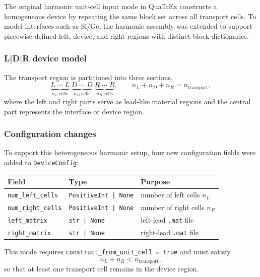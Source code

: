 The original harmonic unit-cell input mode in QuaTrEx constructs a
homogeneous device by repeating the same block set across all transport
cells.  To model interfaces such as Si/Ge, the harmonic assembly was
extended to support piecewise-defined left, device, and right regions
with distinct block dictionaries.

\subsubsection{L|D|R device model}

The transport region is partitioned into three sections,
\begin{equation}\label{eq:ldr}
  \underbrace{L\;\cdots\;L}_{n_L\;\text{cells}}
  \;\underbrace{D\;\cdots\;D}_{n_D\;\text{cells}}
  \;\underbrace{R\;\cdots\;R}_{n_R\;\text{cells}},
  \qquad
  n_L + n_D + n_R = n_\mathrm{transport},
\end{equation}
where the left and right parts serve as lead-like material regions and
the central part represents the interface or device region.

\subsubsection{Configuration changes}

To support this heterogeneous harmonic setup, four new configuration
fields were added to \texttt{DeviceConfig}:
\begin{center}
\begin{tabular}{lll}
  \toprule
  Field & Type & Purpose \\
  \midrule
  \texttt{num\_left\_cells}  & \texttt{PositiveInt | None} & number of left cells $n_L$ \\
  \texttt{num\_right\_cells} & \texttt{PositiveInt | None} & number of right cells $n_R$ \\
  \texttt{left\_matrix}      & \texttt{str | None}         & left-lead \texttt{.mat} file \\
  \texttt{right\_matrix}     & \texttt{str | None}         & right-lead \texttt{.mat} file \\
  \bottomrule
\end{tabular}
\end{center}
This mode requires
\texttt{construct\_from\_unit\_cell = true} and must satisfy
\begin{equation}
  n_L + n_R < n_\mathrm{transport},
\end{equation}
so that at least one transport cell remains in the device region.

